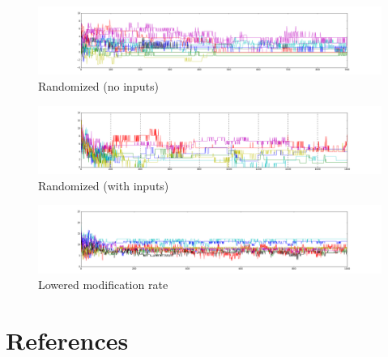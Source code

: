 \documentclass[12pt]{article}
\begin{document}
\begin{figure}[H]
    \centering
    \includegraphics[width=\textheight,angle=270,keepaspectratio]{../visualizations/8knodes_stable_line.png}
    \caption{Randomized (no inputs)}
\end{figure}

\begin{figure}[H]
    \centering
    \includegraphics[width=\textheight,angle=270,keepaspectratio]{../visualizations/8knodes_sensors_lineannotated.png}
    \caption{Randomized (with inputs)}
\end{figure}

\begin{figure}[H]
    \centering
    \includegraphics[width=\textheight,angle=270,keepaspectratio]{../visualizations/lowrate1000frames.png}
    \caption{Lowered modification rate}
\end{figure}


\newpage

\section{References}

\printbibliography[heading=none]
\end{document}
